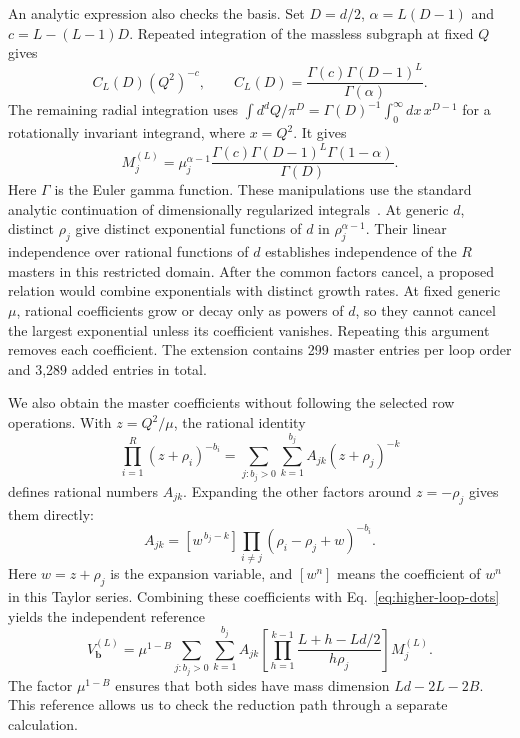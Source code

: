 An analytic expression also checks the basis. Set $D=d/2$,
$\alpha=L(D-1)$ and $c=L-(L-1)D$. Repeated integration of the
massless subgraph at fixed $Q$ gives
\begin{equation}
 C_L(D)(Q^2)^{-c},\qquad
 C_L(D)=\frac{\Gamma(c)\Gamma(D-1)^L}{\Gamma(\alpha)} .
 \label{eq:higher-loop-convolution}
\end{equation}
The remaining radial integration uses
$\int d^dQ/\pi^D=\Gamma(D)^{-1}\int_0^\infty
dx\,x^{D-1}$ for a rotationally invariant integrand, where $x=Q^2$.
It gives
\begin{equation}
 M_j^{(L)}=
 \mu_j^{\alpha-1}
 \frac{\Gamma(c)\Gamma(D-1)^L\Gamma(1-\alpha)}{\Gamma(D)} .
 \label{eq:higher-loop-master-value}
\end{equation}
Here $\Gamma$ is the Euler gamma function. These manipulations use
the standard analytic continuation of dimensionally regularized
integrals~\cite{Weinzierl2022}. At generic $d$, distinct $\rho_j$
give distinct exponential functions of $d$ in
$\rho_j^{\alpha-1}$. Their linear independence over rational
functions of $d$ establishes independence of the $R$ masters in this
restricted domain. After the common factors cancel, a proposed
relation would combine exponentials with distinct growth rates.
At fixed generic $\mu$, rational coefficients grow or decay only
as powers of $d$, so they cannot cancel the largest exponential
unless its coefficient vanishes. Repeating this argument removes
each coefficient. The extension contains 299 master entries per
loop order and 3,289 added entries in total.

We also obtain the master coefficients without following the selected
row operations. With $z=Q^2/\mu$, the rational identity
\begin{equation}
 \prod_{i=1}^{R}(z+\rho_i)^{-b_i}
 =\sum_{j:b_j>0}\sum_{k=1}^{b_j}
                 A_{jk}(z+\rho_j)^{-k}
 \label{eq:higher-loop-oracle}
\end{equation}
defines rational numbers $A_{jk}$. Expanding the other factors
around $z=-\rho_j$ gives them directly:
\begin{equation}
 A_{jk}=[w^{\,b_j-k}]
           \prod_{i\ne j}(\rho_i-\rho_j+w)^{-b_i}.
 \label{eq:higher-loop-taylor}
\end{equation}
Here $w=z+\rho_j$ is the expansion variable, and $[w^n]$ means
the coefficient of $w^n$ in this Taylor
series. Combining these coefficients with
Eq.~\eqref{eq:higher-loop-dots} yields the independent reference
\begin{equation}
 V^{(L)}_{\boldsymbol b}
 =\mu^{1-B}\sum_{j:b_j>0}\sum_{k=1}^{b_j}A_{jk}
   \left[\prod_{h=1}^{k-1}
             \frac{L+h-Ld/2}{h\rho_j}\right]M_j^{(L)} .
 \label{eq:higher-loop-reference}
\end{equation}
The factor $\mu^{1-B}$ ensures that both sides have mass dimension
$Ld-2L-2B$. This reference allows us to check the reduction path
through a separate calculation.

